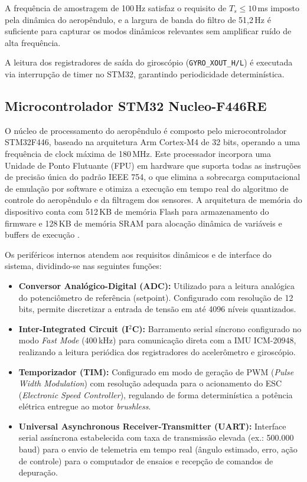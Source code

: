 A frequência de amostragem de 100\,Hz satisfaz o requisito de $T_s \leq 10$\,ms imposto pela dinâmica do aeropêndulo, e a largura de banda do filtro de 51,2\,Hz é suficiente para capturar os modos dinâmicos relevantes sem amplificar ruído de alta frequência.

A leitura dos registradores de saída do giroscópio (\texttt{GYRO\_XOUT\_H/L}) é executada via interrupção de timer no STM32, garantindo periodicidade determinística.



\subsection{Microcontrolador STM32 Nucleo-F446RE}

O núcleo de processamento do aeropêndulo é composto pelo microcontrolador STM32F446, baseado na arquitetura Arm Cortex-M4 de 32 bits, operando a uma frequência de clock máxima de 180\,MHz. Este processador incorpora uma Unidade de Ponto Flutuante (FPU) em hardware que suporta todas as instruções de precisão única do padrão IEEE 754, o que elimina a sobrecarga computacional de emulação por software e otimiza a execução em tempo real do algoritmo de controle do aeropêndulo e da filtragem dos sensores. A arquitetura de memória do dispositivo conta com 512\,KB de memória Flash para armazenamento do firmware e 128\,KB de memória SRAM para alocação dinâmica de variáveis e buffers de execução \cite{stm32}.

Os periféricos internos atendem aos requisitos dinâmicos e de interface do sistema, dividindo-se nas seguintes funções:

\begin{itemize}
    \item \textbf{Conversor Analógico-Digital (ADC):} Utilizado para a leitura analógica do potenciômetro de referência (setpoint). Configurado com resolução de 12 bits, permite discretizar a entrada de tensão em até 4096 níveis quantizados.
    \item \textbf{Inter-Integrated Circuit (I$^2$C):} Barramento serial síncrono configurado no modo \textit{Fast Mode} (400\,kHz) para comunicação direta com a IMU ICM-20948, realizando a leitura periódica dos registradores do acelerômetro e giroscópio.
    \item \textbf{Temporizador (TIM):} Configurado em modo de geração de PWM (\textit{Pulse Width Modulation}) com resolução adequada para o acionamento do ESC (\textit{Electronic Speed Controller}), regulando de forma determinística a potência elétrica entregue ao motor \textit{brushless}.
    \item \textbf{Universal Asynchronous Receiver-Transmitter (UART):} Interface serial assíncrona estabelecida com taxa de transmissão elevada (ex.: 500.000\,baud) para o envio de telemetria em tempo real (ângulo estimado, erro, ação de controle) para o computador de ensaios e recepção de comandos de depuração.
\end{itemize}

